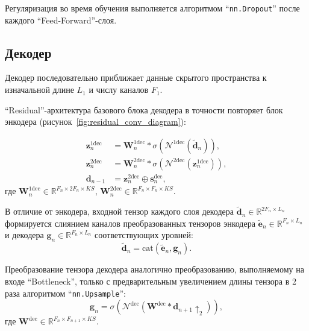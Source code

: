 Регуляризация во время обучения выполняется алгоритмом \enquote{\texttt{nn.Dropout}} после каждого \enquote{Feed-Forward}-слоя.

\subsection{Декодер}
Декодер последовательно приближает данные скрытого пространства к изначальной длине ${L_1}$ и числу каналов ${F_1}$.

\enquote{Residual}-архитектура базового блока декодера в точности повторяет блок энкодера (рисунок~\ref{fig:residual_conv_diagram}):

\begin{equation*}
    \begin{aligned}
        \mathbf{z}_n^{1\text{dec}} &= \mathbf{W}_n^{1\text{dec}} \ast \sigma\left(\mathcal{N}^{1\text{dec}}\left(\tilde{\mathbf{d}}_{n}\right)\right), \\
        \mathbf{z}_n^{2\text{dec}} &= \mathbf{W}_n^{2\text{dec}} \ast \sigma\left(\mathcal{N}^{2\text{dec}}\left(\mathbf{z}_n^{1\text{dec}}\right)\right), \\
        \mathbf{d}_{n-1} &= \mathbf{z}_n^{2\text{dec}} \oplus \mathbf{s}_n^\text{dec},
    \end{aligned}
\end{equation*}
где ${\mathbf{W}_n^{1\text{dec}} \in \mathbb{R}^{F_n \times 2F_n \times KS}}$, ${\mathbf{W}_n^{2\text{dec}} \in \mathbb{R}^{F_n \times F_n \times KS}}$.

В отличие от энкодера, входной тензор каждого слоя декодера ${\tilde{\mathbf{d}}_n \in \mathbb{R}^{2F_n \times L_n}}$ формируется слиянием каналов преобразованных тензоров энкодера ${\tilde{\mathbf{e}}_n \in \mathbb{R}^{F_n \times L_n}}$ и декодера ${\mathbf{g}_n \in \mathbb{R}^{F_n \times L_n}}$ соответствующих уровней:
\begin{equation*}
    \tilde{\mathbf{d}}_n = \text{cat}\left(\tilde{\mathbf{e}}_n, \mathbf{g}_n \right).
\end{equation*}

Преобразование тензора декодера аналогично преобразованию, выполняемому на входе \enquote{Bottleneck}, только с предварительным увеличением длины тензора в 2 раза алгоритмом \enquote{\texttt{nn.Upsample}}:
\begin{equation*}
    \mathbf{g}_n = \sigma\left(\mathcal{N}^{\text{dec}}\left(\mathbf{W}^{\text{dec}} \ast \mathbf{d}_{n+1}{\uparrow_2}\right)\right),
\end{equation*}
где ${\mathbf{W}^{\text{dec}}} \in \mathbb{R}^{F_n \times F_{n+1} \times KS}$.

